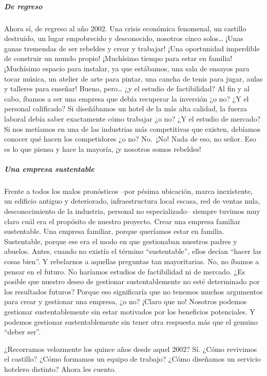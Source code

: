 \documentclass[
]{article}
\begin{document}
\hypertarget{de-regreso}{%
\subparagraph{De regreso}\label{de-regreso}}

Ahora sí, de regreso al año 2002. Una crisis económica fenomenal, un
castillo destruido, un lugar empobrecido y desconocido, nosotros cinco
solos\ldots{} ¡Unas ganas tremendas de ser rebeldes y crear y trabajar!
¡Una oportunidad imperdible de construir un mundo propio! ¡Muchísimo
tiempo para estar en familia! ¡Muchísimo espacio para instalar, ya que
estábamos, una sala de ensayos para tocar música, un atelier de arte
para pintar, una cancha de tenis para jugar, aulas y talleres para
enseñar! Bueno, pero\ldots{} ¿y el estudio de factibilidad? Al fin y al
cabo, íbamos a ser una empresa que debía recuperar la inversión ¿o no?
¿Y el personal calificado? Si diseñábamos un hotel de la más alta
calidad, la fuerza laboral debía saber exactamente cómo trabajar ¿o no?
¿Y el estudio de mercado? Si nos metíamos en una de las industrias más
competitivas que existen, debíamos conocer qué hacen los competidores ¿o
no? No.~¡No! Nada de eso, no señor. Eso es lo que piensa y hace la
mayoría, ¡y nosotros somos rebeldes!

\hypertarget{una-empresa-sustentable}{%
\subparagraph{Una empresa sustentable}\label{una-empresa-sustentable}}

Frente a todos los malos pronósticos --por pésima ubicación, marca
inexistente, un edificio antiguo y deteriorado, infraestructura local
escasa, red de ventas nula, desconocimiento de la industria, personal no
especializado-- siempre tuvimos muy claro cuál era el propósito de
nuestro proyecto. Crear una empresa familiar sustentable. Una empresa
familiar, porque queríamos estar en familia. Sustentable, porque ese era
el modo en que gestionaban nuestros padres y abuelos. Antes, cuando no
existía el término ``sustentable'', ellos decían ``hacer las cosas
bien''. Y rebelarnos a aquellas preguntas tan mayoritarias. No, no
íbamos a pensar en el futuro. No haríamos estudios de factibilidad ni de
mercado. ¿Es posible que nuestro deseo de gestionar sustentablemente no
esté determinado por los resultados futuros? Porque eso significaría que
no tenemos muchos argumentos para crear y gestionar una empresa, ¿o no?
¡Claro que no! Nosotros podemos gestionar sustentablemente sin estar
motivados por los beneficios potenciales. Y podemos gestionar
sustentablemente sin tener otra respuesta más que el genuino ``deber
ser''.

¿Recorramos velozmente los quince años desde aquel 2002? Sí. ¿Cómo
revivimos el castillo? ¿Cómo formamos un equipo de trabajo? ¿Cómo
diseñamos un servicio hotelero distinto? Ahora les cuento.
\end{document}
